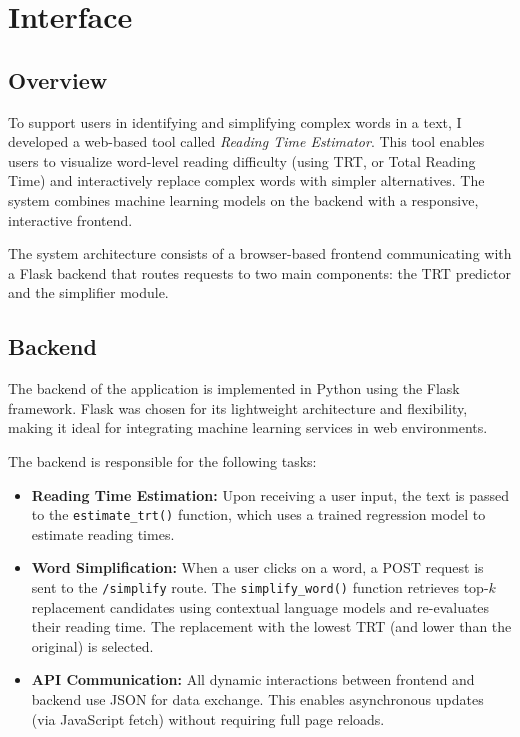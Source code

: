 \chapter{Interface}

\section{Overview}
To support users in identifying and simplifying complex words in a text, I developed a web-based tool called \textit{Reading Time Estimator}. This tool enables users to visualize word-level reading difficulty (using TRT, or Total Reading Time) and interactively replace complex words with simpler alternatives. The system combines machine learning models on the backend with a responsive, interactive frontend.

The system architecture consists of a browser-based frontend communicating with a Flask backend that routes requests to two main components: the TRT predictor and the simplifier module. 

\section{Backend}
The backend of the application is implemented in Python using the Flask framework. Flask was chosen for its lightweight architecture and flexibility, making it ideal for integrating machine learning services in web environments.

The backend is responsible for the following tasks:
\begin{itemize}
    \item \textbf{Reading Time Estimation:} Upon receiving a user input, the text is passed to the \texttt{estimate\_trt()} function, which uses a trained regression model to estimate reading times.
    
    \item \textbf{Word Simplification:} When a user clicks on a word, a POST request is sent to the \texttt{/simplify} route. The \texttt{simplify\_word()} function retrieves top-$k$ replacement candidates using contextual language models and re-evaluates their reading time. The replacement with the lowest TRT (and lower than the original) is selected.
    
    \item \textbf{API Communication:} All dynamic interactions between frontend and backend use JSON for data exchange. This enables asynchronous updates (via JavaScript fetch) without requiring full page reloads.
\end{itemize}

